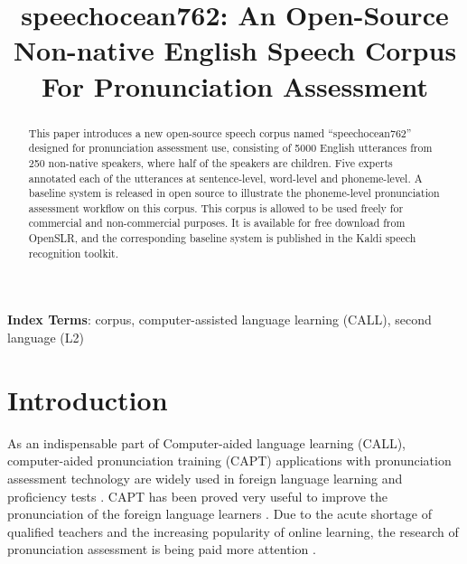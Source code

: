 \documentclass[a4paper]{article}
\title{speechocean762: An Open-Source Non-native English Speech Corpus For Pronunciation Assessment}
\begin{document}
\maketitle
\begin{abstract}
  This paper introduces a new open-source speech corpus named “speechocean762” designed for pronunciation assessment use, consisting of 5000 English utterances from 250 non-native speakers, where half of the speakers are children. Five experts annotated each of the utterances at sentence-level, word-level and phoneme-level. A baseline system is released in open source to illustrate the phoneme-level pronunciation assessment workflow on this corpus. This corpus is allowed to be used freely for commercial and non-commercial purposes. It is available for free download from OpenSLR, and the corresponding baseline system is published in the Kaldi speech recognition toolkit.
\end{abstract}
\noindent\textbf{Index Terms}: corpus, computer-assisted language learning (CALL), second language (L2)

\section{Introduction}

As an indispensable part of Computer-aided language learning (CALL), computer-aided pronunciation training (CAPT) applications with pronunciation assessment technology are widely used in foreign language learning \cite{franco2010eduspeak,li2020training} and proficiency tests \cite{gu2020using}.
CAPT has been proved very useful to improve the pronunciation of the foreign language learners \cite{wang2014optimization}.
Due to the acute shortage of qualified teachers \cite{mcvey2019nuance} and the increasing popularity of online learning, the research of pronunciation assessment is being paid more attention \cite{cheng2020improving}.
\end{document}
